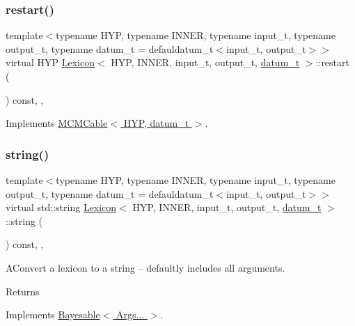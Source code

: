 \subsubsection{\texorpdfstring{restart()}{restart()}}
{\footnotesize\ttfamily template$<$typename H\+YP, typename I\+N\+N\+ER, typename input\+\_\+t, typename output\+\_\+t, typename datum\+\_\+t = defauldatum\+\_\+t$<$input\+\_\+t, output\+\_\+t$>$$>$ \\
virtual H\+YP \hyperlink{class_lexicon}{Lexicon}$<$ H\+YP, I\+N\+N\+ER, input\+\_\+t, output\+\_\+t, \hyperlink{class_bayesable_a9f1a6c0cd7855550fa10b1a8f13a5867}{datum\+\_\+t} $>$\+::restart (\begin{DoxyParamCaption}{ }\end{DoxyParamCaption}) const\hspace{0.3cm}{\ttfamily [inline]}, {\ttfamily [override]}, {\ttfamily [virtual]}}



Implements \hyperlink{class_m_c_m_cable_a220d6c4ca73e20441c14fa5bd3e090d3}{M\+C\+M\+Cable$<$ H\+Y\+P, datum\+\_\+t $>$}.

\mbox{\label{class_lexicon_a5c584d2885a21542082332a26eb0961b}} 
\subsubsection{\texorpdfstring{string()}{string()}}
{\footnotesize\ttfamily template$<$typename H\+YP, typename I\+N\+N\+ER, typename input\+\_\+t, typename output\+\_\+t, typename datum\+\_\+t = defauldatum\+\_\+t$<$input\+\_\+t, output\+\_\+t$>$$>$ \\
virtual std\+::string \hyperlink{class_lexicon}{Lexicon}$<$ H\+YP, I\+N\+N\+ER, input\+\_\+t, output\+\_\+t, \hyperlink{class_bayesable_a9f1a6c0cd7855550fa10b1a8f13a5867}{datum\+\_\+t} $>$\+::string (\begin{DoxyParamCaption}{ }\end{DoxyParamCaption}) const\hspace{0.3cm}{\ttfamily [inline]}, {\ttfamily [override]}, {\ttfamily [virtual]}}

A\+Convert a lexicon to a string -- defaultly includes all arguments. \begin{DoxyReturn}{Returns}

\end{DoxyReturn}


Implements \hyperlink{class_bayesable_afcea9b439bcf321d5354710d8861cb54}{Bayesable$<$ Args... $>$}.



